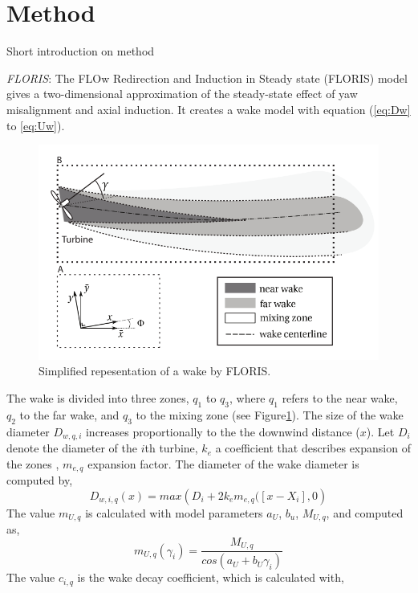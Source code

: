 \section{Method}
\label{sec:method}
	
Short introduction on method 

\textit{FLORIS}: The FLOw Redirection and Induction in Steady state (FLORIS) model gives a two-dimensional approximation of the steady-state effect of yaw misalignment and axial induction. It creates a wake model with equation (\ref{eq:Dw} to \ref{eq:Uw}). 
\begin{figure}
  	\includegraphics[width=\linewidth]{./Figures/WakeFLORIS.png}
  	\caption{Simplified repesentation of a wake by FLORIS.}
	\label{fig:wake}
\end{figure}
The wake is divided into three zones, $q_1$ to $q_3$, where $q_1$ refers to the near wake, $q_2$ to the far wake, and $q_3$ to the mixing zone (see Figure\ref{fig:wake}).
The size of the wake diameter $D_{w,q,i}$ increases proportionally to the the downwind distance ($x$). Let $D_i$ denote the diameter of the $i$th turbine, $k_e$ a coefficient that describes expansion of the zones \cite{Gebraad2016}, $m_{e,q}$ expansion factor. The diameter of the wake diameter is computed by,
\begin{equation}
\label{eq:Dw}
D_{w,i,q}(x) = max\left( {D_i + 2k_em_{e,q}([x - X_i],0} \right)
\end{equation}
The value $m_{U,q}$ is calculated with model parameters $a_U$, $b_u$, $M_{U,q}$, and computed as,
\begin{equation}
\label{eq:mU}
m_{U,q}(\gamma_i) =  \frac{M_{U,q}}{cos(a_U+b_U\gamma_i)}
\end{equation}
The value $c_{i,q}$ is the wake decay coefficient, which is calculated with,
